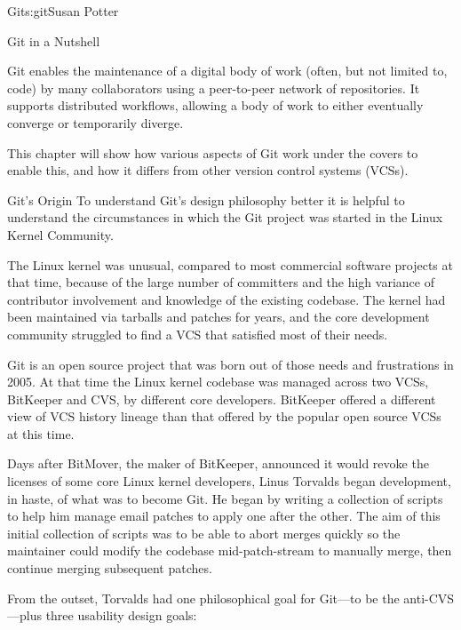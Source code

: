 \begin{aosachapter}{Git}{s:git}{Susan Potter}

\begin{aosasect1}{Git in a Nutshell}

Git enables the maintenance of a digital body of work (often, but not limited
to, code) by many collaborators using a peer-to-peer network of
repositories. It supports distributed workflows, allowing a
body of work to either eventually converge or temporarily diverge.

This chapter will show how various aspects of Git work under the covers
to enable this, and how it differs from other version control systems (VCSs).

\end{aosasect1}

\begin{aosasect1}{Git's Origin}
To understand Git's design philosophy better it is helpful to understand the
circumstances in which the Git project was started in the Linux Kernel
Community. 

The Linux kernel was unusual, compared to most commercial software projects at that
time, because of the large number of committers and the high variance of
contributor involvement and knowledge of the existing
codebase. 
The kernel had been maintained via tarballs and patches for years, and  
the core development community struggled to find a VCS that
satisfied most of their needs.

Git is an open source project that was born out of those needs and
frustrations in 2005. At that time
the Linux kernel codebase was managed across two VCSs, BitKeeper
and CVS, by different core developers. BitKeeper offered a different
view of VCS history lineage than that offered by the popular open source VCSs at this
time.

Days after BitMover, the maker of BitKeeper, announced it would revoke the licenses
of some core Linux kernel developers, Linus Torvalds began development, in
haste, of what was to become Git. He began by writing a
collection of scripts to help him manage email patches to apply one after
the other. The aim of this initial collection of scripts was to be able to abort
merges quickly so the maintainer could modify the codebase
mid-patch-stream to manually merge, then continue merging subsequent patches.

From the outset, Torvalds had one philosophical goal for Git---to be the anti-CVS---plus
three usability design goals:


\end{aosasect1}
\end{aosachapter}

